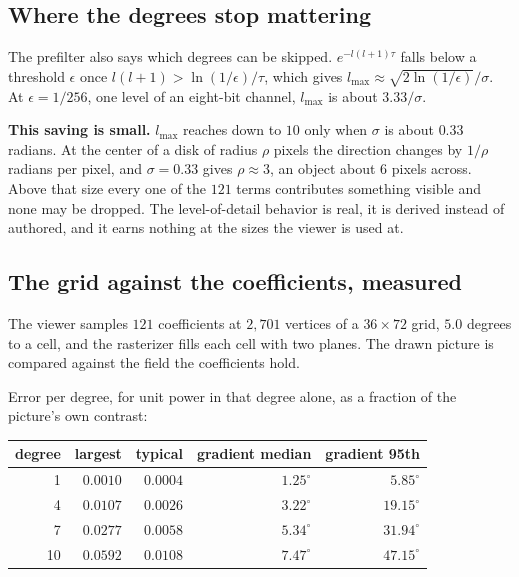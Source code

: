 \subsection{Where the degrees stop mattering}

The prefilter also says which degrees can be skipped. \(e^{-l(l+1)\tau}\) falls below a threshold \(\epsilon\) once \(l(l+1) > \ln(1/\epsilon)/\tau\), which gives \(l_{\max} \approx \sqrt{2\ln(1/\epsilon)}/\sigma\). At \(\epsilon = 1/256\), one level of an eight-bit channel, \(l_{\max}\) is about \(3.33/\sigma\).

\textbf{This saving is small.} \(l_{\max}\) reaches down to \(10\) only when \(\sigma\) is about \(0.33\) radians. At the center of a disk of radius \(\rho\) pixels the direction changes by \(1/\rho\) radians per pixel, and \(\sigma = 0.33\) gives \(\rho \approx 3\), an object about \(6\) pixels across. Above that size every one of the \(121\) terms contributes something visible and none may be dropped. The level-of-detail behavior is real, it is derived instead of authored, and it earns nothing at the sizes the viewer is used at.

\subsection{The grid against the coefficients, measured}

The viewer samples \(121\) coefficients at \(2{,}701\) vertices of a \(36 \times 72\) grid, \(5.0\) degrees to a cell, and the rasterizer fills each cell with two planes. The drawn picture is compared against the field the coefficients hold.

Error per degree, for unit power in that degree alone, as a fraction of the picture's own contrast:

\begin{center}
\begin{tabular}{@{}rrrrr@{}}
\toprule
degree & largest & typical & gradient median & gradient 95th \\
\midrule
1 & \(0.0010\) & \(0.0004\) & \(1.25^\circ\) & \(5.85^\circ\) \\
4 & \(0.0107\) & \(0.0026\) & \(3.22^\circ\) & \(19.15^\circ\) \\
7 & \(0.0277\) & \(0.0058\) & \(5.34^\circ\) & \(31.94^\circ\) \\
10 & \(0.0592\) & \(0.0108\) & \(7.47^\circ\) & \(47.15^\circ\) \\
\bottomrule
\end{tabular}
\end{center}


